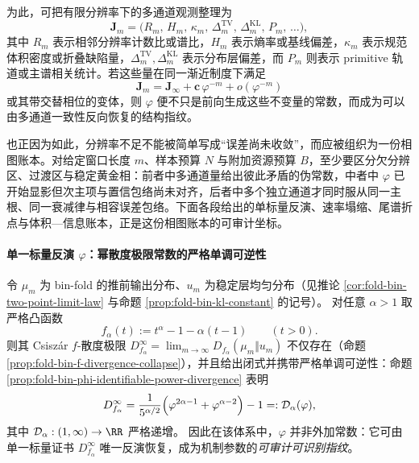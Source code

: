为此，可把有限分辨率下的多通道观测整理为
\[
\mathbf J_m=
\bigl(
R_m,\,
H_m,\,
\kappa_m,\,
\Delta_m^{\mathrm{TV}},\,
\Delta_m^{\mathrm{KL}},\,
P_m,\,
\ldots
\bigr),
\]
其中 \(R_m\) 表示相邻分辨率计数比或谱比，\(H_m\) 表示熵率或基线偏差，\(\kappa_m\) 表示规范体积密度或折叠缺陷量，\(\Delta_m^{\mathrm{TV}},\Delta_m^{\mathrm{KL}}\) 表示分布层偏差，而 \(P_m\) 则表示 primitive 轨道或主谱相关统计。若这些量在同一渐近制度下满足
\[
\mathbf J_m
=
\mathbf J_\infty
+ \mathbf c\,\varphi^{-m}
+ o(\varphi^{-m})
\]
或其带交替相位的变体，则 \(\varphi\) 便不只是前向生成这些不变量的常数，而成为可以由多通道一致性反向恢复的结构指纹。

也正因为如此，分辨率不足不能被简单写成“误差尚未收敛”，而应被组织为一份相图账本。对给定窗口长度 \(m\)、样本预算 \(N\) 与附加资源预算 \(B\)，至少要区分欠分辨区、过渡区与稳定黄金相：前者中多通道量给出彼此矛盾的伪常数，中者中 \(\varphi\) 已开始显影但次主项与置信包络尚未对齐，后者中多个独立通道才同时服从同一主根、同一衰减律与相容误差包络。下面各段给出的单标量反演、速率塌缩、尾谱折点与体积—信息账本，正是这份相图账本的可审计坐标。

\paragraph{单一标量反演 \texorpdfstring{$\varphi$}{phi}：幂散度极限常数的严格单调可逆性}
令 \(\mu_m\) 为 bin-fold 的推前输出分布、\(u_m\) 为稳定层均匀分布（见推论 \ref{cor:fold-bin-two-point-limit-law} 与命题 \ref{prop:fold-bin-kl-constant} 的记号）。
对任意 \(\alpha>1\) 取严格凸函数
\[
f_\alpha(t):=t^\alpha-1-\alpha(t-1)\qquad(t>0).
\]
则其 Csisz\'ar \(f\)-散度极限
\(
D_{f_\alpha}^\infty=\lim_{m\to\infty}D_{f_\alpha}(\mu_m\Vert u_m)
\)
不仅存在（命题 \ref{prop:fold-bin-f-divergence-collapse}），并且给出闭式并携带严格单调可逆性：命题 \ref{prop:fold-bin-phi-identifiable-power-divergence} 表明
\[
D_{f_\alpha}^\infty
=\frac{1}{5^{\alpha/2}}\Bigl(\varphi^{2\alpha-1}+\varphi^{\alpha-2}\Bigr)-1
=:\mathcal{D}_\alpha(\varphi),
\]
其中 \(\mathcal{D}_\alpha:(1,\infty)\to\RR\) 严格递增。
因此在该体系中，\(\varphi\) 并非外加常数：它可由单一标量证书 \(D_{f_\alpha}^\infty\) 唯一反演恢复，成为机制参数的\emph{可审计可识别指纹}。

